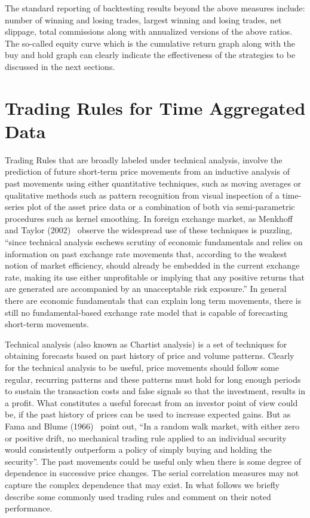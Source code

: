 The standard reporting of backtesting results beyond the above measures include: number of winning and losing trades, largest winning and losing trades, net slippage, total commissions along with annualized versions of the above ratios. The so-called equity curve which is the cumulative return graph along with the buy and hold graph can clearly indicate the effectiveness of the strategies to be discussed in the next sections. 



\section{Trading Rules for Time Aggregated Data \label{s:trading_rules_tad}}

Trading Rules that are broadly labeled under technical analysis, involve the prediction of future short-term price movements from an inductive analysis of past movements using either quantitative techniques, such as moving averages or qualitative methods such as pattern recognition from visual inspection of a time-series plot of the asset price data or a combination of both via semi-parametric procedures such as kernel smoothing. In foreign exchange market, as Menkhoff and Taylor (2002)~\cite{MalTay} observe the widespread use of these techniques is puzzling, ``since technical analysis eschews scrutiny of economic fundamentals and relies on information on past exchange rate movements that, according to the weakest notion of market efficiency, should already be embedded in the current exchange rate, making its use either unprofitable or implying that any positive returns that are generated are accompanied by an unacceptable risk exposure.'' In general there are economic fundamentals that can explain long term movements, there is still no fundamental-based exchange rate model that is capable of forecasting short-term movements.


Technical analysis (also known as Chartist analysis) is a set of techniques for obtaining forecasts based on past history of price and volume patterns. Clearly for the technical analysis to be useful, price movements should follow some regular, recurring patterns and these patterns must hold for long enough periods to sustain the transaction costs and false signals so that the investment, results in a profit. What constitutes a useful forecast from an investor point of view could be, if the past history of prices can be used to increase expected gains. But as Fama and Blume (1966)~\cite{famablume} point out, ``In a random walk market, with either zero or positive drift, no mechanical trading rule applied to an individual security would consistently outperform a policy of simply buying and holding the security''. The past movements could be useful only when there is some degree of dependence in successive price changes. The serial correlation measures may not capture the complex dependence that may exist. In what follows we briefly describe some commonly used trading rules and comment on their noted performance.



